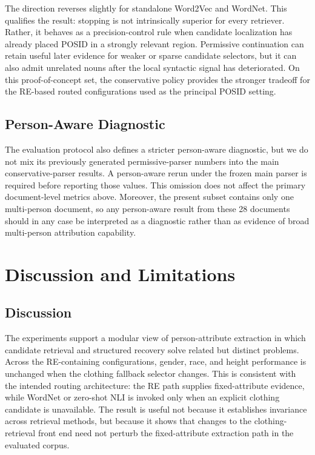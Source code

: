 \documentclass[sigconf,nonacm]{acmart}
\begin{document}
The direction reverses slightly for standalone Word2Vec and WordNet.  This
qualifies the result: stopping is not intrinsically superior for every
retriever.  Rather, it behaves as a precision-control rule when candidate
localization has already placed POSID in a strongly relevant region.  Permissive
continuation can retain useful later evidence for weaker or sparse candidate
selectors, but it can also admit unrelated nouns after the local syntactic
signal has deteriorated.  On this proof-of-concept set, the conservative policy
provides the stronger tradeoff for the RE-based routed configurations used as
the principal POSID setting.

\subsection{Person-Aware Diagnostic}
\label{subsec:results-person-aware}

The evaluation protocol also defines a stricter person-aware diagnostic, but we
do not mix its previously generated permissive-parser numbers into the main
conservative-parser results.  A person-aware rerun under the frozen main parser
is required before reporting those values.  This omission does not affect the
primary document-level metrics above.  Moreover, the present subset contains
only one multi-person document, so any person-aware result from these 28
documents should in any case be interpreted as a diagnostic rather than as
evidence of broad multi-person attribution capability.

\section{Discussion and Limitations}
\label{sec:discussion}

\subsection{Discussion}
\label{subsec:discussion}

The experiments support a modular view of person-attribute extraction in which
candidate retrieval and structured recovery solve related but distinct
problems. Across the RE-containing configurations, gender, race, and height
performance is unchanged when the clothing fallback selector changes. This is
consistent with the intended routing architecture: the RE path supplies
fixed-attribute evidence, while WordNet or zero-shot NLI is invoked only when
an explicit clothing candidate is unavailable. The result is useful not
because it establishes invariance across retrieval methods, but because it
shows that changes to the clothing-retrieval front end need not perturb the
fixed-attribute extraction path in the evaluated corpus.
\end{document}
